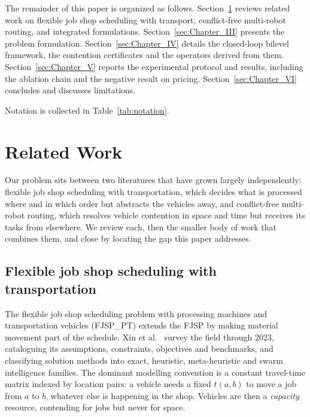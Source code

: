 \documentclass[manuscript,screen,review]{acmart}
\begin{document}
The remainder of this paper is organized as follows.
Section~\ref{sec:Chapter_II} reviews related work on flexible job shop
scheduling with transport, conflict-free multi-robot routing, and integrated
formulations. Section~\ref{sec:Chapter_III} presents the problem formulation.
Section~\ref{sec:Chapter_IV} details the closed-loop bilevel framework, the
contention certificates and the operators derived from them.
Section~\ref{sec:Chapter_V} reports the experimental protocol and results,
including the ablation chain and the negative result on pricing.
Section~\ref{sec:Chapter_VI} concludes and discusses limitations.

Notation is collected in Table~\ref{tab:notation}.



\section{Related Work}
\label{sec:Chapter_II}

Our problem sits between two literatures that have grown largely independently:
flexible job shop scheduling with transportation, which decides what is processed
where and in which order but abstracts the vehicles away, and conflict-free
multi-robot routing, which resolves vehicle contention in space and time but
receives its tasks from elsewhere. We review each, then the smaller body of work
that combines them, and close by locating the gap this paper addresses.

\subsection{Flexible job shop scheduling with transportation}

The flexible job shop scheduling problem with processing machines and
transportation vehicles (FJSP\_PT) extends the FJSP by making material movement
part of the schedule. Xin et al.~\cite{xin2025review} survey the field through
2023, cataloguing its assumptions, constraints, objectives and benchmarks, and
classifying solution methods into exact, heuristic, meta-heuristic and swarm
intelligence families. The dominant modelling convention is a constant
travel-time matrix indexed by location pairs: a vehicle needs a fixed $t(a,b)$
to move a job from $a$ to $b$, whatever else is happening in the shop. Vehicles are then
a \emph{capacity} resource, contending for jobs but never for space.
\end{document}
